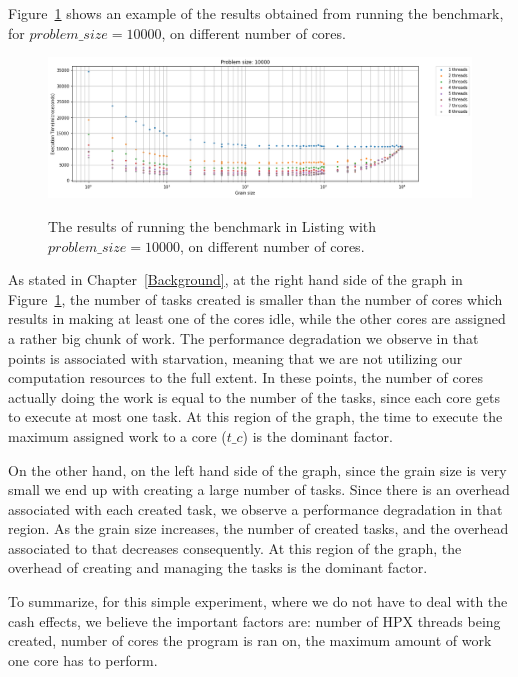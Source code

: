  
 
Figure~\ref{fig39} shows an example of the results obtained from running the benchmark, for $problem\_size=10000$, on different number of cores.

\vspace{\baselineskip}	
\begin{figure}[H]
	\centering
	{\includegraphics[scale=.45]{images/hpx_for_loop/10000_8_all.png}}
	\caption{The results of running the benchmark in Listing with $problem\_size=10000$, on different number of cores.}\label{fig39}		
\end{figure}

As stated in Chapter~\ref{Background}, at the right hand side of the graph in Figure~\ref{fig39}, the number of tasks created is smaller than the number of cores which results in making at least one of the cores idle, while the other cores are assigned a rather big chunk of work. The performance degradation we observe in that points is associated with starvation, meaning that we are not utilizing our computation resources to the full extent. In these points, the number of cores actually doing the work is equal to the number of the tasks, since each core gets to execute at most one task. At this region of the graph, the time to execute the maximum assigned work to a core ($t\_c$) is the dominant factor.   

On the other hand, on the left hand side of the graph, since the grain size is very small we end up with creating a large number of tasks. Since there is an overhead associated with each created task, we observe a performance degradation in that region. As the grain size increases, the number of created tasks, and the overhead associated to that decreases consequently. At this region of the graph, the overhead of creating and managing the tasks is the dominant factor.   

To summarize, for this simple experiment, where we do not have to deal with the cash effects, we believe the important factors are: number of HPX threads being created, number of cores the program is ran on, the maximum amount of work one core has to perform. 

